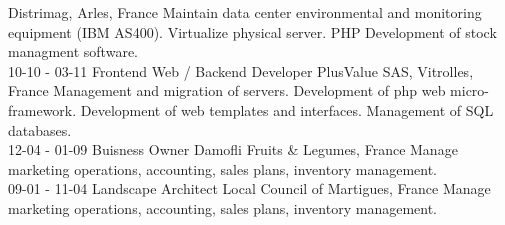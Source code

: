 \documentclass[]{friggeri-cv}
\begin{document}
\begin{entrylist}
        {Distrimag, Arles, France}
        {Maintain data center environmental and monitoring equipment (IBM AS400). Virtualize physical server. PHP Development of stock managment software.\\}
    \entry
        {10-10 - 03-11}
        {Frontend Web / Backend Developer}
        {PlusValue SAS, Vitrolles, France}
        {Management and migration of servers. Development of php web micro-framework. Development of web templates and interfaces. Management of SQL databases.\\}
    \entry
        {12-04 - 01-09}
        {Buisness Owner}
        {Damofli Fruits \& Legumes, France}
        {Manage marketing operations, accounting, sales plans, inventory management.\\}
    \entry
        {09-01 - 11-04}
        {Landscape Architect}
        {Local Council of Martigues, France}
        {Manage marketing operations, accounting, sales plans, inventory management.\\}
\end{entrylist}
\end{document}
